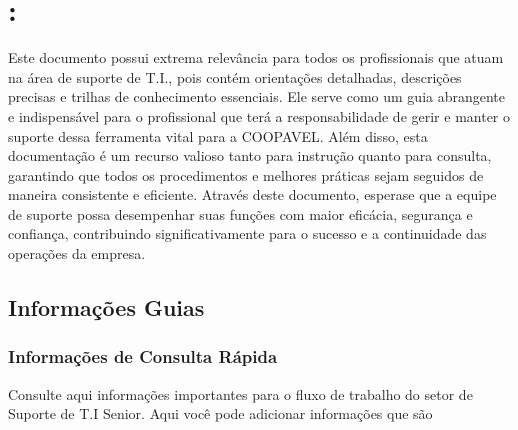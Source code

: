 \documentclass[a4paper,10pt,portuges]{sphinxmanual}
\begin{document}
\section{:}
\label{\detokenize{index:importancia-do-conteudo}}
\sphinxAtStartPar
Este documento possui extrema relevância para todos os profissionais que atuam na área de suporte de T.I., pois contém orientações detalhadas, descrições precisas e trilhas de conhecimento essenciais. Ele serve como um guia abrangente e indispensável para o profissional que terá a responsabilidade de gerir e manter o suporte dessa ferramenta vital para a COOPAVEL. Além disso, esta documentação é um recurso valioso tanto para instrução quanto para consulta, garantindo que todos os procedimentos e melhores práticas sejam seguidos de maneira consistente e eficiente. Através deste documento, espera\sphinxhyphen{}se que a equipe de suporte possa desempenhar suas funções com maior eficácia, segurança e confiança, contribuindo significativamente para o sucesso e a continuidade das operações da empresa.

\sphinxstepscope


\subsection{Informações Guias}
\label{\detokenize{info:informacoes-guias}}\label{\detokenize{info::doc}}

\subsubsection{Informações de Consulta Rápida}
\label{\detokenize{info:informacoes-de-consulta-rapida}}
\sphinxAtStartPar
Consulte aqui informações importantes para o fluxo de trabalho do setor de Suporte de T.I Senior.
Aqui você pode adicionar informações que são
\end{document}

